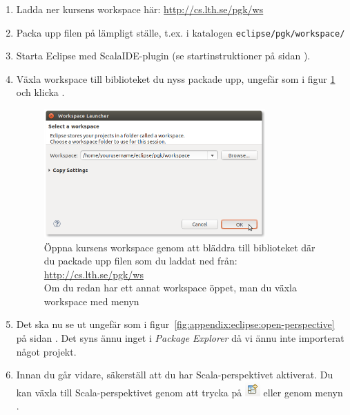\begin{enumerate}
\item Ladda ner kursens workspace här: \url{http://cs.lth.se/pgk/ws}

\item Packa upp filen på lämpligt ställe, t.ex. i katalogen \texttt{eclipse/pgk/workspace/}

\item Starta Eclipse med ScalaIDE-plugin (se startinstruktioner på sidan \pageref{subsubsection:start:eclipse}).

\item Växla workspace till biblioteket du nyss packade upp, ungefär som i figur \ref{fig:eclipse:ide:open} och klicka .

\begin{figure}[H]
\centering
\includegraphics[width=0.8\textwidth]{../img/eclipse/eclipse-select-workspace.png}
\caption {Öppna kursens workspace genom att bläddra till biblioteket där du packade upp filen som du laddat ned från: \url{http://cs.lth.se/pgk/ws} \\Om du redan har ett annat workspace öppet, man du växla workspace med menyn }
\label{fig:eclipse:ide:open}
\end{figure}

\item
Det ska nu se ut ungefär som i figur~\ref{fig:appendix:eclipse:open-perspective} på sidan \pageref{fig:appendix:eclipse:open-perspective}. Det syns ännu inget i \textit{Package Explorer} då vi ännu inte importerat något projekt.

\item Innan du går vidare, säkerställ att du har Scala-perspektivet aktiverat. Du kan växla till Scala-perspektivet genom att trycka på \includegraphics[scale=0.75]{../img/eclipse/eclipse-perspective-button.png} eller genom menyn .



\end{enumerate}

